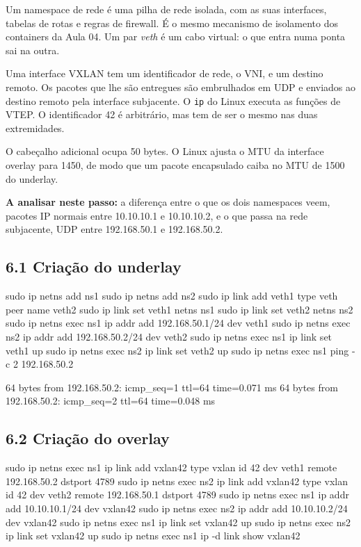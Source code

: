 \documentclass[11pt,a4paper]{article}
\newcommand{\cmd}[1]{\texttt{#1}}
\begin{document}
\begin{teoria}
Um namespace de rede é uma pilha de rede isolada, com as suas interfaces, tabelas de rotas e regras de firewall. É o mesmo mecanismo de isolamento dos containers da Aula 04. Um par \emph{veth} é um cabo virtual: o que entra numa ponta sai na outra.

Uma interface VXLAN tem um identificador de rede, o VNI, e um destino remoto. Os pacotes que lhe são entregues são embrulhados em UDP e enviados ao destino remoto pela interface subjacente. O \cmd{ip} do Linux executa as funções de VTEP. O identificador 42 é arbitrário, mas tem de ser o mesmo nas duas extremidades.

O cabeçalho adicional ocupa 50 bytes. O Linux ajusta o MTU da interface overlay para 1450, de modo que um pacote encapsulado caiba no MTU de 1500 do underlay.

\textbf{A analisar neste passo:} a diferença entre o que os dois namespaces veem, pacotes IP normais entre 10.10.10.1 e 10.10.10.2, e o que passa na rede subjacente, UDP entre 192.168.50.1 e 192.168.50.2.
\end{teoria}

\subsection*{6.1 Criação do underlay}

\begin{terminal}
sudo ip netns add ns1
sudo ip netns add ns2
sudo ip link add veth1 type veth peer name veth2
sudo ip link set veth1 netns ns1
sudo ip link set veth2 netns ns2
sudo ip netns exec ns1 ip addr add 192.168.50.1/24 dev veth1
sudo ip netns exec ns2 ip addr add 192.168.50.2/24 dev veth2
sudo ip netns exec ns1 ip link set veth1 up
sudo ip netns exec ns2 ip link set veth2 up
sudo ip netns exec ns1 ping -c 2 192.168.50.2
\end{terminal}

\begin{saida}
64 bytes from 192.168.50.2: icmp_seq=1 ttl=64 time=0.071 ms
64 bytes from 192.168.50.2: icmp_seq=2 ttl=64 time=0.048 ms
\end{saida}

\subsection*{6.2 Criação do overlay}

\begin{terminal}
sudo ip netns exec ns1 ip link add vxlan42 type vxlan id 42 dev veth1 remote 192.168.50.2 dstport 4789
sudo ip netns exec ns2 ip link add vxlan42 type vxlan id 42 dev veth2 remote 192.168.50.1 dstport 4789
sudo ip netns exec ns1 ip addr add 10.10.10.1/24 dev vxlan42
sudo ip netns exec ns2 ip addr add 10.10.10.2/24 dev vxlan42
sudo ip netns exec ns1 ip link set vxlan42 up
sudo ip netns exec ns2 ip link set vxlan42 up
sudo ip netns exec ns1 ip -d link show vxlan42
\end{terminal}
\end{document}

